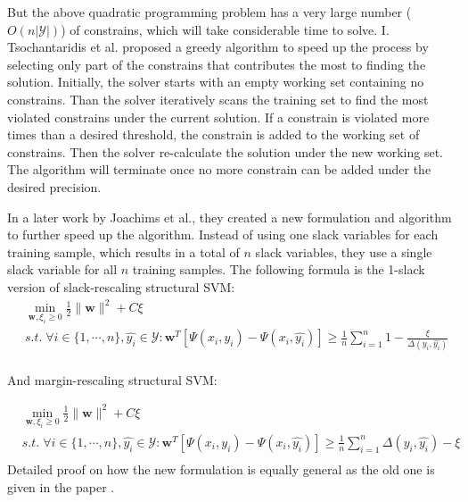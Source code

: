 But the above quadratic programming problem has a very large number ($O(n|\mathcal{Y}|)$) of constrains, which will take considerable time to solve. I. Tsochantaridis et al. \cite{svm2005} proposed a greedy algorithm to speed up the process by selecting only part of the constrains that contributes the most to finding the solution. Initially, the solver starts with an empty working set containing no constrains. Than the solver iteratively scans the training set to find the most violated constrains under the current solution. If a constrain is violated more times than a desired threshold, the constrain is added to the working set of constrains. Then the solver re-calculate the solution under the new working set. The algorithm will terminate once no more constrain can be added under the desired precision.

In a later work by Joachims et al.\cite{svm2009}, they created a new formulation and algorithm to further speed up the algorithm. Instead of using one slack variables for each training sample, which results in a total of $n$ slack variables, they use a single slack variable for all $n$ training samples. The following formula is the 1-slack version of slack-rescaling structural SVM:
$$
\begin{aligned}
    & \min_{\mathbf{w}, \xi_i \geq 0} \frac{1}{2}\|\mathbf{w}\|^2  + C \xi\\
    &s.t.\; \forall i \in \{1,\cdots,n\},\hat{y_i} \in \mathcal{Y}: \mathbf{w}^T[\Psi(x_i,y_i) - \Psi(x_i,\hat{y_i})] \geq \frac{1}{n}\sum^n_{i=1}1 - \frac{\xi}{\Delta(y_i, \hat{y_i})} \\
\end{aligned}
$$

And margin-rescaling structural SVM:

$$
\begin{aligned}
    & \min_{\mathbf{w}, \xi_i \geq 0} \frac{1}{2}\|\mathbf{w}\|^2  + C \xi\\
    & s.t.\; \forall i \in \{1,\cdots,n\},\hat{y_i} \in \mathcal{Y}: \mathbf{w}^T[\Psi(x_i,y_i) - \Psi(x_i,\hat{y_i})] \geq \frac{1}{n}\sum^n_{i=1}\Delta(y_i, \hat{y_i}) - \xi \\
\end{aligned}
$$
%
Detailed proof on how the new formulation is equally general as the old one is given in the paper \cite{svm2009}.

